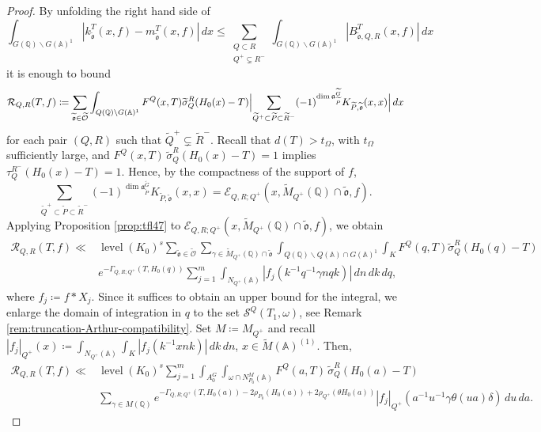 \documentclass[12pt]{amsart}
\theoremstyle{definition}
\theoremstyle{plain}
\theoremstyle{remark}
\def\Q{\mathbb{Q}}%
\def\A{\mathbb{A}}%
\def\bs{\backslash}%
\newcommand{\fa}{\mathfrak{a}}
\newcommand{\cE}{\mathcal{E}}
\newcommand{\cR}{\mathcal{R}}
\newcommand{\cS}{\mathcal{S}}
\numberwithin{equation}{section}
\newcommand{\tG}{\widetilde{G}}
\newcommand{\tM}{\widetilde{M}}
\newcommand{\tP}{\widetilde{P}}
\newcommand{\tQ}{\widetilde{Q}}
\newcommand{\tR}{\widetilde{R}}
\newcommand{\tsigma}{\widetilde{\sigma}}
\newcommand{\tfo}{\widetilde{\mathfrak{o}}}
\newcommand{\tcO}{\widetilde{\mathcal{O}}}
\newcommand{\level}{\operatorname{level}}
\begin{document}
\begin{proof}%
By unfolding the right hand side of
\[
\int_{G(\Q)\bs G(\A)^1} | k_{\tfo}^T(x,f)-m_{\tfo}^T(x,f)| \, dx
   \le \sum_{\substack{Q\subset R\\Q^+ \subsetneq R^-}}
         \int_{G(\Q)\bs G(\A)^1} |B_{\tfo,Q,R}^T(x,f)|\, dx
\]
it is enough to bound
\[
 \cR_{Q,R}(T,f)
  \coloneqq\sum_{\tfo\in\tcO}\int_{Q(\Q)\bs G(\A)^1}
      F^Q(x,T)\widetilde\sigma_Q^R(H_0(x)-T)
      \Bigl|\sum_{\tQ^+\subset \tP\subset \tR^-} (-1)^{\dim\fa_{\tP}^{\tG}}  K_{\tP,\tfo}( x, x)\Bigr|\,dx
\]
for each pair $(Q,R)$ such that $\tQ^+\subsetneq \tR^-$.
Recall that $d(T)>t_\Omega$, with $t_\Omega$ sufficiently large, and $F^Q(x,T)\, \tsigma_Q^R(H_0(x)-T)=1$ implies $\tau_Q^{R^-}(H_0(x)-T)=1$. 
Hence, by the compactness of the support of $f$, 
\[
\sum_{\tQ^+\subset \tP\subset \tR^-} (-1)^{\dim\fa_{\tP}^{\tG}}  K_{\tP,\tfo}( x, x)=\cE_{Q,R;Q^+}(x,\tM_{Q^+}(\Q)\cap\tfo,f).
\]
Applying Proposition \ref{prop:tfl47} to $\cE_{Q,R;Q^+}(x,\tM_{Q^+}(\Q)\cap\tfo,f)$, we obtain
\begin{align*}
\cR_{Q,R}(T,f)\ll& \level(K_0)^s\sum_{\tfo\in\tcO}\sum_{\gamma\in \tM_{Q^+}(\Q)\cap\tfo}  
      \int_{Q(\Q)\bs Q(\A)\cap G(\A)^1}\int_K F^Q(q,T)\widetilde\sigma_Q^R(H_0(q)-T) \\
      &  e^{-\Gamma_{Q,R;Q^+}(T,H_0(q))} \sum_{j=1}^m\int_{N_{Q^+}(\A)} |f_j(k^{-1}q^{-1}\gamma nqk)|\,dn\, dk \, dq ,
\end{align*}
where $f_j\coloneqq f*X_j$. %
Since it suffices to obtain an upper bound for the integral, we enlarge the domain of integration in $q$ to the set $\cS^Q(T_1,\omega)$, see Remark \ref{rem:truncation-Arthur-compatibility}. 
Set $M\coloneqq M_{Q^+}$ and recall $|f_{j}|_{Q^+}(x)\coloneqq \int_{N_{Q^+}(\A)} \int_K |f_j(k^{-1}xn k)| \, dk \, dn$, $x\in \tM(\A)^{(1)}$. 
Then, 
\begin{align*}
\cR_{Q,R}(T,f)\ll& \level(K_0)^s \sum_{j=1}^m  
      \int_{A_0^G} \int_{\omega\cap N_{P_0}^M(\A)} F^Q(a,T)\, \widetilde\sigma_Q^R(H_0(a)-T) \\
      &  \sum_{\gamma\in M(\Q)}e^{-\Gamma_{Q,R;Q^+}(T,H_0(a))-2\rho_{P_0}(H_0(a))+ 2\rho_{Q^+}(\theta H_0(a))}  |f_{j}|_{Q^+}(a^{-1}u^{-1}\gamma\theta(ua) \delta) \, du \, da.

\end{align*}
\end{proof}
\end{document}
